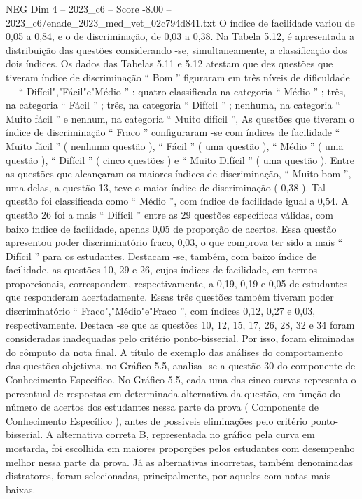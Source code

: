 \begin{textsample}{NEG Dim 4 – 2023\_c6 – Score -8.00 – 2023\_c6/enade\_2023\_med\_vet\_02c794d841.txt}
O índice de facilidade variou de 0,05 a 0,84, e o de discriminação, de 0,03 a 0,38.
Na Tabela 5.12, é apresentada a distribuição das questões considerando -se, simultaneamente, a classificação dos dois índices.
Os dados das Tabelas 5.11 e 5.12 atestam que dez questões que tiveram índice de discriminação “ Bom ” figuraram em três níveis de dificuldade — “ Difícil","Fácil"e"Médio ” : quatro classificada na categoria “ Médio ” ; três, na categoria “ Fácil ” ; três, na categoria “ Difícil ” ; nenhuma, na categoria “ Muito fácil ” e nenhum, na categoria “ Muito difícil ”, As questões que tiveram o índice de discriminação “ Fraco ” configuraram -se com índices de facilidade “ Muito fácil ” ( nenhuma questão ), “ Fácil ” ( uma questão ), “ Médio ” ( uma questão ), “ Difícil ” ( cinco questões ) e “ Muito Difícil ” ( uma questão ).
Entre as questões que alcançaram os maiores índices de discriminação, “ Muito bom ”, uma delas, a questão 13, teve o maior índice de discriminação ( 0,38 ).
Tal questão foi classificada como “ Médio ”, com índice de facilidade igual a 0,54.
A questão 26 foi a mais “ Difícil ” entre as 29 questões específicas válidas, com baixo índice de facilidade, apenas 0,05 de proporção de acertos.
Essa questão apresentou poder discriminatório fraco, 0,03, o que comprova ter sido a mais “ Difícil ” para os estudantes.
Destacam -se, também, com baixo índice de facilidade, as questões 10, 29 e 26, cujos índices de facilidade, em termos proporcionais, correspondem, respectivamente, a 0,19, 0,19 e 0,05 de estudantes que responderam acertadamente.
Essas três questões também tiveram poder discriminatório “ Fraco","Médio"e"Fraco ”, com índices 0,12, 0,27 e 0,03, respectivamente.
Destaca -se que as questões 10, 12, 15, 17, 26, 28, 32 e 34 foram consideradas inadequadas pelo critério ponto-bisserial.
Por isso, foram eliminadas do cômputo da nota final.
A título de exemplo das análises do comportamento das questões objetivas, no Gráfico 5.5, analisa -se a questão 30 do componente de Conhecimento Específico.
No Gráfico 5.5, cada uma das cinco curvas representa o percentual de respostas em determinada alternativa da questão, em função do número de acertos dos estudantes nessa parte da prova ( Componente de Conhecimento Específico ), antes de possíveis eliminações pelo critério ponto-bisserial.
A alternativa correta B, representada no gráfico pela curva em mostarda, foi escolhida em maiores proporções pelos estudantes com desempenho melhor nessa parte da prova.
Já as alternativas incorretas, também denominadas distratores, foram selecionadas, principalmente, por aqueles com notas mais baixas.

\end{textsample}
